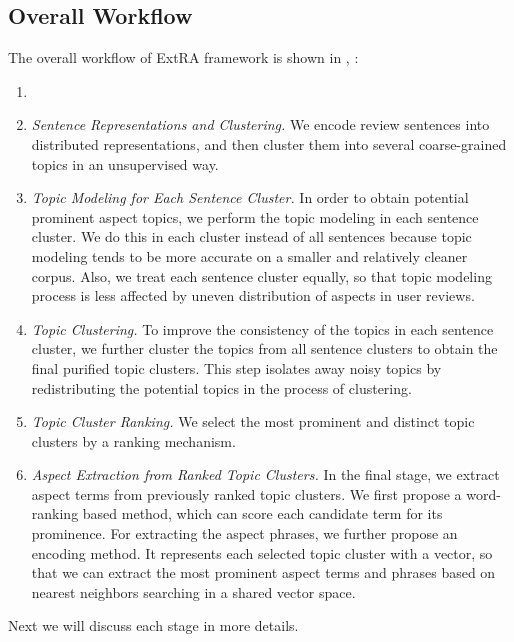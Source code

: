 \subsection{Overall Workflow}
The overall workflow of ExtRA framework is shown in , :
\begin{enumerate}
\item\textit{}

\item\textit{Sentence Representations and Clustering.} 
We encode review sentences into distributed representations, and then cluster them into several coarse-grained topics in an unsupervised way.
\item \textit{Topic Modeling for Each Sentence Cluster.} 
In order to obtain potential prominent aspect topics, 
we perform the topic modeling in each sentence cluster. 
We do this in each cluster instead of all sentences because
topic modeling tends to be more accurate on a smaller and
relatively cleaner corpus.
Also, we treat each sentence cluster equally, so that topic modeling 
process is less affected by uneven distribution of aspects in
user reviews.
\item \textit{Topic Clustering.} To improve the consistency of the 
topics in each sentence cluster, we further cluster the topics from 
all sentence clusters to obtain the final purified topic clusters. 
This step isolates away noisy topics by redistributing the 
potential topics in the process of clustering.
\item  \textit{Topic Cluster Ranking.} We select the most prominent 
and distinct topic clusters by a ranking mechanism.
\item \textit{Aspect Extraction from Ranked Topic Clusters.} 
In the final stage, we extract aspect terms from previously ranked topic clusters. 
We first propose a word-ranking based method, which can score each candidate term for its prominence. 
For extracting the aspect phrases, we further propose an encoding method.
It represents each selected topic cluster with a vector,  so that we can extract  the most prominent aspect terms and phrases
based on nearest neighbors searching in 
a shared vector space.  
\end{enumerate}
Next we will discuss each stage in more details.

